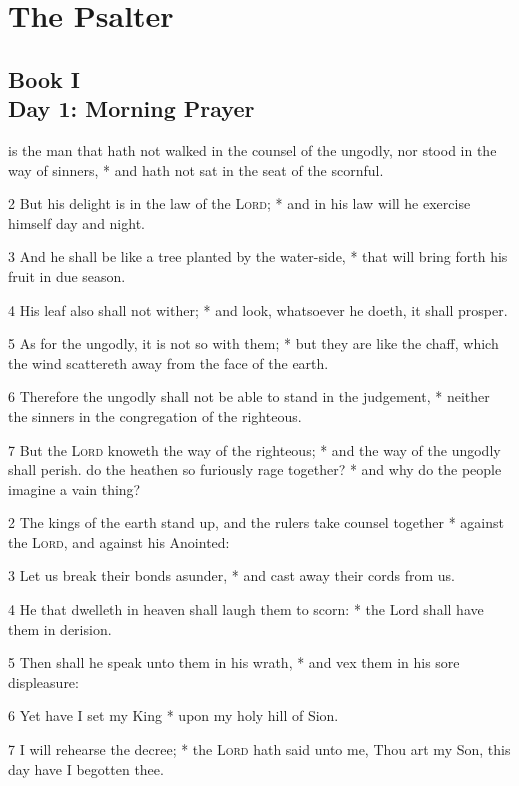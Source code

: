\section{The Psalter}
\subsection{Book I\\Day 1: Morning Prayer}
 is the man that hath not walked in the counsel of the ungodly, nor stood in the way of sinners, * and hath not sat in the seat of the scornful.\par
2 But his delight is in the law of the {\textsc{Lord}}; * and in his law will he exercise himself day and night.\par
3 And he shall be like a tree planted by the water-side, * that will bring forth his fruit in due season.\par
4 His leaf also shall not wither; * and look, whatsoever he doeth, it shall prosper.\par
5 As for the ungodly, it is not so with them; * but they are like the chaff, which the wind scattereth away from the face of the earth.\par
6 Therefore the ungodly shall not be able to stand in the judgement, * neither the sinners in the congregation of the righteous.\par
7 But the {\textsc{Lord}} knoweth the way of the righteous; * and the way of the ungodly shall perish.
 do the heathen so furiously rage together? * and why do the people imagine a vain thing?\par
2 The kings of the earth stand up, and the rulers take counsel together * against the {\textsc{Lord}}, and against his Anointed:\par
3 Let us break their bonds asunder, * and cast away their cords from us.\par
4 He that dwelleth in heaven shall laugh them to scorn: * the Lord shall have them in derision.\par
5 Then shall he speak unto them in his wrath, * and vex them in his sore displeasure:\par
6 Yet have I set my King * upon my holy hill of Sion.\par
7 I will rehearse the decree; * the {\textsc{Lord}} hath said unto me, Thou art my Son, this day have I begotten thee.\par
